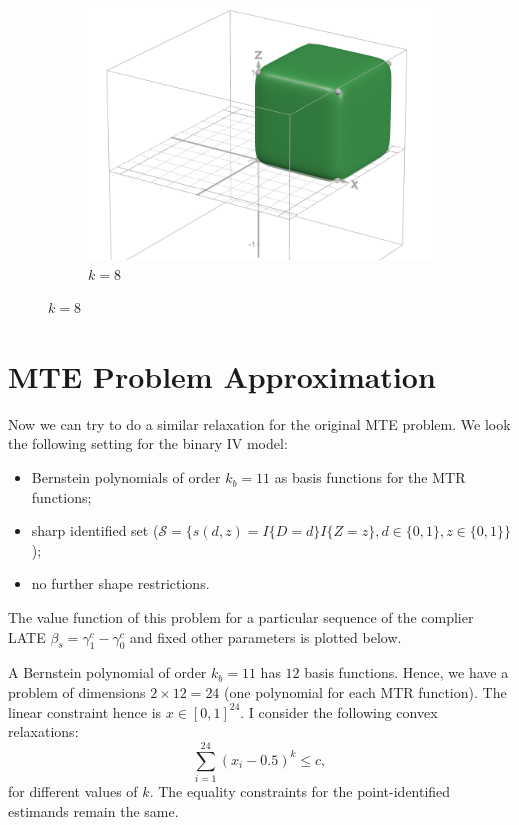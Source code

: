\documentclass[11pt,a4paper,english]{article} %
\numberwithin{equation}{section}
\numberwithin{figure}{section}
\numberwithin{table}{section}
\theoremstyle{definition}
\theoremstyle{remark}
\begin{document}
\begin{figure}
	\begin{subfigure}{0.5\textwidth}
		\includegraphics[width=\textwidth]{figures/desmos_dim_3_k_8.png}
		\caption{$k=8$}
	\end{subfigure}
\end{figure}

\section{MTE Problem Approximation}
Now we can try to do a similar relaxation for the original MTE problem.
We look the following setting for the binary IV model:
\begin{itemize}
	\item Bernstein polynomials of order $k_b = 11$ as basis functions for the MTR functions;
	\item sharp identified set ($\mathcal{S} = \{s(d,z) = I\{D=d\}I\{Z=z\}, d \in\{0,1\}, z \in \{0,1\}\}$);
	\item no further shape restrictions.
\end{itemize}
The value function of this problem for a particular sequence of the complier LATE $\beta_s = \gamma_1^c - \gamma_0^c$ and fixed other parameters is plotted below.

A Bernstein polynomial of order $k_b=11$ has $12$ basis functions. Hence, we have a problem of dimensions $2 \times 12 = 24$ (one polynomial for each MTR function).
The linear constraint hence is $x\in[0,1]^{24}$.
I consider the following convex relaxations:
\begin{equation*}
	\sum_{i=1}^{24} (x_i - 0.5)^k \leq c,
\end{equation*}
for different values of $k$.
The equality constraints for the point-identified estimands remain the same.
\end{document}

